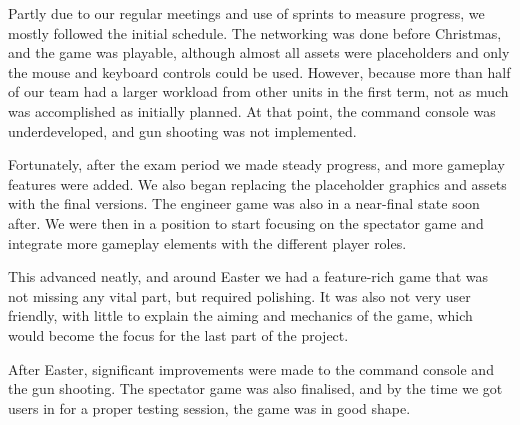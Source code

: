 \documentclass[a4paper,11pt]{article}
\begin{document}
Partly due to our regular meetings and use of sprints to measure progress, we mostly followed the initial schedule. The networking was done before Christmas, and the game was playable, although almost all assets were placeholders and only the mouse and keyboard controls could be used. However, because more than half of our team had a larger workload from other units in the first term, not as much was accomplished as initially planned. At that point, the command console was underdeveloped, and gun shooting was not implemented.

Fortunately, after the exam period we made steady progress, and more gameplay features were added. We also began replacing the placeholder graphics and assets with the final versions. The engineer game was also in a near-final state soon after. We were then in a position to start focusing on the spectator game and integrate more gameplay elements with the different player roles.

This advanced neatly, and around Easter we had a feature-rich game that was not missing any vital part, but required polishing. It was also not very user friendly, with little to explain the aiming and mechanics of the game, which would become the focus for the last part of the project.

After Easter, significant improvements were made to the command console and the gun shooting. The spectator game was also finalised, and by the time we got users in for a proper testing session, the game was in good shape.
\end{document}
